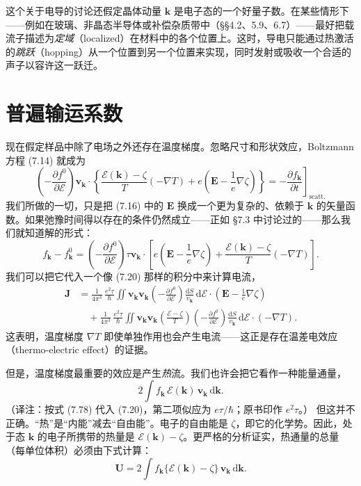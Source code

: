 这个关于电导的讨论还假定晶体动量 $\mathbf{k}$ 是电子态的一个好量子数。在某些情形下——例如在玻璃、非晶态半导体或补偿杂质带中（§§4.2、5.9、6.7）——最好把载流子描述为\emph{定域}（localized）在材料中的各个位置上。这时，导电只能通过热激活的\emph{跳跃}（hopping）从一个位置到另一个位置来实现，同时发射或吸收一个合适的声子以容许这一跃迁。

\section{普遍输运系数}

现在假定样品中除了电场之外还存在温度梯度。忽略尺寸和形状效应，Boltzmann 方程 (7.14) 就成为
\begin{equation*}
\left(-\frac{\partial f^{0}}{\partial\mathcal{E}}\right)\mathbf{v}_{\mathbf{k}}\cdot\left\{\frac{\mathcal{E}(\mathbf{k})-\zeta}{T}(-\nabla T)+e\left(\mathbf{E}-\frac{1}{e}\nabla\zeta\right)\right\}=-\left.\frac{\partial f_{\mathbf{k}}}{\partial t}\right]_{\text{scatt.}}\tag{7.77}
\end{equation*}
我们所做的一切，只是把 (7.16) 中的 $\mathbf{E}$ 换成一个更为复杂的、依赖于 $\mathbf{k}$ 的矢量函数。如果弛豫时间得以存在的条件仍然成立——正如 §7.3 中讨论过的——那么我们就知道解的形式：
\begin{equation*}
f_{\mathbf{k}}-f^{0}_{\mathbf{k}}=\left(-\frac{\partial f^{0}}{\partial\mathcal{E}}\right)\tau\mathbf{v}_{\mathbf{k}}\cdot\left[e\left(\mathbf{E}-\frac{1}{e}\nabla\zeta\right)+\frac{\mathcal{E}(\mathbf{k})-\zeta}{T}(-\nabla T)\right].\tag{7.78}
\end{equation*}
我们可以把它代入一个像 (7.20) 那样的积分中来计算电流，
\begin{align*}
\mathbf{J}&=\frac{1}{4\pi^{3}}\,\frac{e^{2}\tau}{\hbar}\iint\mathbf{v}_{\mathbf{k}}\mathbf{v}_{\mathbf{k}}\left(-\frac{\partial f^{0}}{\partial\mathcal{E}}\right)\frac{\mathrm{d}S}{v_{\mathbf{k}}}\,\mathrm{d}\mathcal{E}\cdot\left(\mathbf{E}-\frac{1}{e}\nabla\zeta\right)\\
&\quad+\frac{1}{4\pi^{3}}\,\frac{e^{2}\tau}{\hbar}\iint\mathbf{v}_{\mathbf{k}}\mathbf{v}_{\mathbf{k}}\left(\frac{\mathcal{E}-\zeta}{T}\right)\left(-\frac{\partial f^{0}}{\partial\mathcal{E}}\right)\frac{\mathrm{d}S}{v_{\mathbf{k}}}\,\mathrm{d}\mathcal{E}\cdot(-\nabla T).\tag{7.79}
\end{align*}
这表明，温度梯度 $\nabla T$ 即使单独作用也会产生电流——这正是存在温差电效应（thermo-electric effect）的证据。

但是，温度梯度最重要的效应是产生\emph{热}流。我们也许会把它看作一种能量通量，
\begin{equation*}
2\int f_{\mathbf{k}}\,\mathcal{E}(\mathbf{k})\,\mathbf{v}_{\mathbf{k}}\,\mathrm{d}\mathbf{k}.
\end{equation*}
（译注：按式 (7.78) 代入 (7.20)，第二项似应为 $e\tau/\hbar$；原书印作 $e^{2}\tau$。）
但这并不正确。“热”是“内能”减去“自由能”。电子的自由能是 $\zeta$，即它的化学势。因此，处于态 $\mathbf{k}$ 的电子所携带的热量是 $\mathcal{E}(\mathbf{k})-\zeta$。更严格的分析证实，热通量的总量（每单位体积）必须由下式计算：
\begin{equation*}
\mathbf{U}=2\int f_{\mathbf{k}}\{\mathcal{E}(\mathbf{k})-\zeta\}\,\mathbf{v}_{\mathbf{k}}\,\mathrm{d}\mathbf{k}.\tag{7.80}
\end{equation*}

